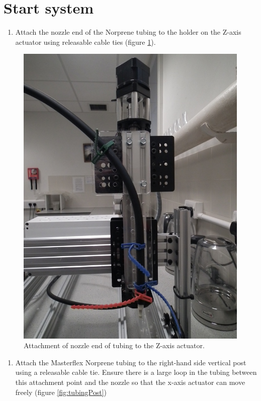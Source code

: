 \documentclass[]{book}
\providecommand{\tightlist}{%
  \setlength{\itemsep}{0pt}\setlength{\parskip}{0pt}}
\theoremstyle{definition}
\theoremstyle{definition}
\theoremstyle{remark}
\begin{document}
\section{Start system}\label{startSystem}

\begin{enumerate}
\def\labelenumi{\arabic{enumi}.}
\tightlist
\item
  Attach the nozzle end of the Norprene tubing to the holder on the
  Z-axis actuator using releasable cable ties (figure
  \ref{fig:attachNozzle}).
\end{enumerate}

\begin{figure}

{\centering \includegraphics[width=0.75\linewidth]{images/pump4} 

}

\caption{Attachment of nozzle end of tubing to the Z-axis actuator.}\label{fig:attachNozzle}
\end{figure}

\begin{enumerate}
\def\labelenumi{\arabic{enumi}.}
\setcounter{enumi}{1}
\tightlist
\item
  Attach the Masterflex Norprene tubing to the right-hand side vertical
  post using a releasable cable tie. Ensure there is a large loop in the
  tubing between this attachment point and the nozzle so that the x-axis
  actuator can move freely (figure \ref{fig:tubingPost})
\end{enumerate}
\end{document}
